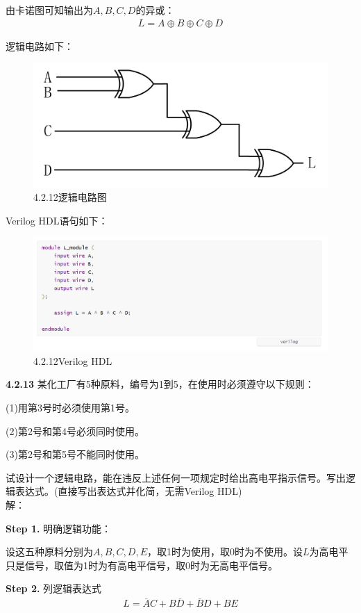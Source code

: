 \documentclass[a4paper,11pt,UTF8]{article}
\begin{document}
由卡诺图可知输出为$A,B,C,D$的异或：
$$\begin{aligned}
	L=A\oplus B\oplus C\oplus D
\end{aligned}
$$

逻辑电路如下：
\begin{figure}[H]
	\centering
	\includegraphics[scale=0.15]{SD4.2.12_2}
	\caption{4.2.12逻辑电路图}
\end{figure}
Verilog HDL语句如下：
\begin{figure}[H]
	\centering
	\includegraphics[scale=0.35]{SD4.2.12_3}
	\caption{4.2.12Verilog HDL}
\end{figure}
\textbf{4.2.13} 某化工厂有5种原料，编号为1到5，在使用时必须遵守以下规则：

(1)用第3号时必须使用第1号。

(2)第2号和第4号必须同时使用。

(3)第2号和第5号不能同时使用。

试设计一个逻辑电路，能在违反上述任何一项规定时给出高电平指示信号。写出逻辑表达式。(直接写出表达式并化简，无需Verilog HDL)\\
解：

\textbf{Step 1.} 明确逻辑功能：

设这五种原料分别为$A,B,C,D,E$，取1时为使用，取0时为不使用。设$L$为高电平只是信号，取值为1时为有高电平信号，取0时为无高电平信号。


\textbf{Step 2.} 列逻辑表达式
$$\begin{aligned}
	L=\overline{A}C+B\overline{D}+\overline{B}D+BE
\end{aligned}
$$
\end{document}
